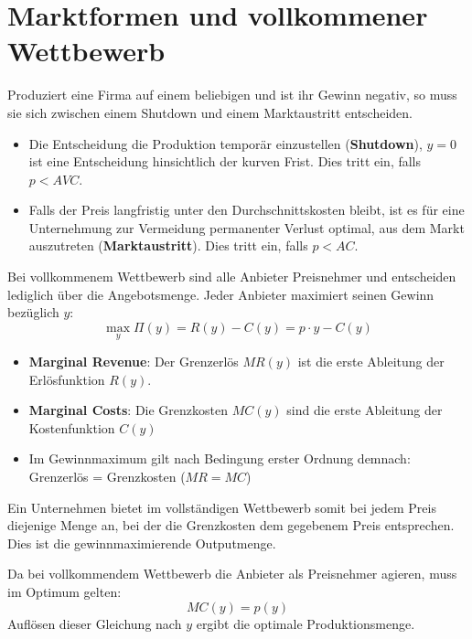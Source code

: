 \chapter{Marktformen und vollkommener Wettbewerb}

Produziert eine Firma auf einem beliebigen und ist ihr Gewinn negativ, so muss sie sich zwischen einem Shutdown und einem Marktaustritt entscheiden.
\begin{itemize}
	\item Die Entscheidung die Produktion temporär einzustellen (\textbf{Shutdown}), $y = 0$ ist eine Entscheidung hinsichtlich der kurven Frist. Dies tritt ein, falls $p < AVC$.
	\item Falls der Preis langfristig unter den Durchschnittskosten bleibt, ist es für eine Unternehmung zur Vermeidung permanenter Verlust optimal, aus dem Markt auszutreten (\textbf{Marktaustritt}). Dies tritt ein, falls $p < AC$.
\end{itemize} %

Bei vollkommenem Wettbewerb sind alle Anbieter Preisnehmer und entscheiden lediglich über die Angebotsmenge. Jeder Anbieter maximiert seinen Gewinn bezüglich $y$:
	$$ \max_y \Pi(y) = R(y) - C(y) = p \cdot y - C(y) $$
	
\begin{itemize}
	\item \textbf{Marginal Revenue}: Der Grenzerlös $MR(y)$ ist die erste Ableitung der Erlösfunktion $R(y)$.
	\item \textbf{Marginal Costs}: Die Grenzkosten $MC(y)$ sind die erste Ableitung der Kostenfunktion $C(y)$
	\item Im Gewinnmaximum gilt nach Bedingung erster Ordnung demnach: Grenzerlös = Grenzkosten ($MR = MC$)
\end{itemize}

Ein Unternehmen bietet im vollständigen Wettbewerb somit bei jedem Preis diejenige Menge an, bei der die Grenzkosten dem gegebenem Preis entsprechen. Dies ist die gewinnmaximierende Outputmenge.

\begin{kr}
	Da bei vollkommendem Wettbewerb die Anbieter als Preisnehmer agieren, muss im Optimum gelten:
	$$ MC(y) = p(y) $$
	Auflösen dieser Gleichung nach $y$ ergibt die optimale Produktionsmenge.
\end{kr}